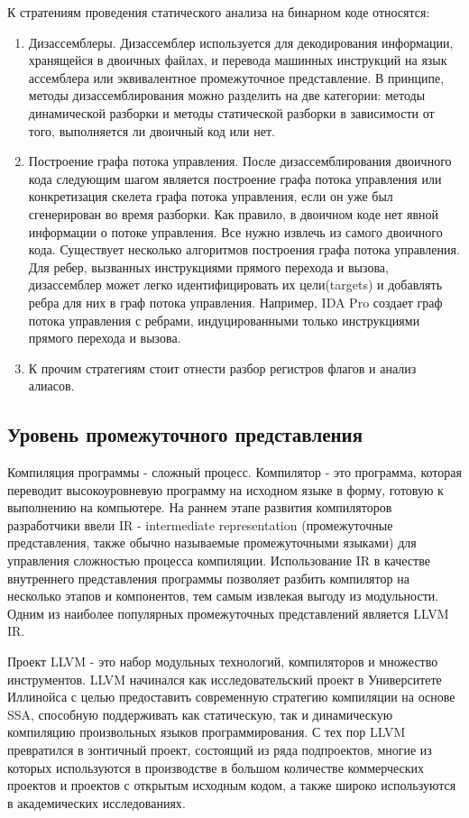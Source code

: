 К стратениям проведения статического анализа на бинарном коде относятся\cite{Zeng2012StaticAO}:
\begin{enumerate}
    \item Дизассемблеры. Дизассемблер используется для декодирования информации, хранящейся в двоичных файлах, и перевода 
        машинных инструкций на язык ассемблера или эквивалентное промежуточное представление. В принципе, методы 
        дизассемблирования можно разделить на две категории: методы динамической разборки и методы статической разборки в 
        зависимости от того, выполняется ли двоичный код или нет. 
    \item Построение графа потока управления. После дизассемблирования двоичного кода следующим шагом является построение 
        графа потока управления или конкретизация скелета графа потока управления, если он уже был сгенерирован во время
        разборки. Как правило, в двоичном коде нет явной информации о потоке управления. Все нужно извлечь из самого 
        двоичного кода. Существует несколько алгоритмов построения графа потока управления. Для ребер, вызванных 
        инструкциями прямого перехода и вызова, дизассемблер может легко идентифицировать их цели(targets) и добавлять 
        ребра для них в граф потока управления. Например, IDA Pro\cite{10.5555/1481438} создает граф потока управления с ребрами, 
        индуцированными только инструкциями прямого перехода и вызова. 
    \item К прочим стратегиям стоит отнести разбор регистров флагов и анализ алиасов.
\end{enumerate}

\subsection{Уровень промежуточного представления}
Компиляция программы - сложный процесс. Компилятор - это программа, которая переводит высокоуровневую программу на исходном языке в форму, готовую к 
выполнению на компьютере. На раннем этапе развития компиляторов разработчики ввели IR - intermediate representation (промежуточные представления, 
также обычно называемые промежуточными языками) для управления сложностью процесса компиляции. Использование IR в качестве внутреннего представления 
программы позволяет разбить компилятор на несколько этапов и компонентов, тем самым извлекая выгоду из модульности. Одним из наиболее популярных 
промежуточных представлений является LLVM IR.

Проект LLVM - это набор модульных технологий, компиляторов и множество инструментов. LLVM начинался как исследовательский проект в Университете 
Иллинойса с целью предоставить современную стратегию компиляции на основе SSA, способную поддерживать как статическую, так и динамическую компиляцию 
произвольных языков программирования. С тех пор LLVM превратился в зонтичный проект, состоящий из ряда подпроектов, многие из которых используются в 
производстве в большом количестве коммерческих проектов и проектов с открытым исходным кодом, а также широко используются в академических 
исследованиях\cite{Chow2013IR}.


